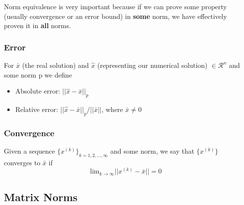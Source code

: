 \documentclass[12pt]{article}
\newcommand{\ve}[1]{\ensuremath{\mathbf{#1}}}
\begin{document}
Norm equivalence is very important because if we can prove some property (usually convergence or an error bound) in \textbf{some} norm, we have effectively proven it in \textbf{all} norms. 

\subsubsection{Error}
For $\bar{x}$ (the real solution) and $\hat{x}$ (representing our numerical solution) $\in \mathcal{R}^n$ and some norm p we define
%
\begin{itemize}
\item Absolute error: $||\hat{x} - \bar{x}||_p$
\item Relative error: $||\hat{x} - \bar{x}||_p / ||\bar{x}||$, where $\bar{x} \neq 0$
\end{itemize}

\subsubsection{Convergence}
Given a sequence $\lbrace x^{(k)} \rbrace_{k=1,2,\dots,\infty}$ and some norm, we say that $\lbrace x^{(k)} \rbrace$ converges to $\bar{x}$ if
%
\begin{equation}
\displaystyle\text{lim}_{k \rightarrow \infty} ||x^{(k)} - \bar{x}|| = 0 \nonumber
\end{equation}

\subsection{Matrix Norms}


\end{document}

